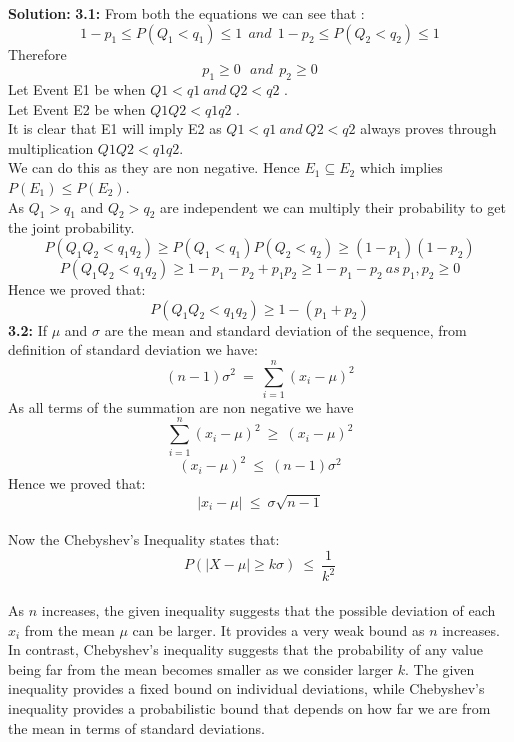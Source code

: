 \documentclass[12pt]{article}
\begin{document}
\textbf{Solution: } 
\newline
\textbf{3.1: } 
From both the equations we can see that :
\begin{equation*}
    1-p_1 \leq P(Q_1<q_1) \leq 1\ \ and\ \    
    1-p_2 \leq P(Q_2<q_2) \leq 1  
\end{equation*}
Therefore
\begin{equation}
    p_1\geq0\ \ \ and\ \  p_2\geq0
\end{equation}
Let Event E1 be when $Q1<q1\ and\ Q2<q2$ . \\
Let Event E2 be when $Q1Q2<q1q2$ . \\
\newline
It is clear that E1 will imply E2 as $Q1<q1\ and\ Q2<q2$ always proves through multiplication $Q1Q2<q1q2$. \\
We can do this as they are non negative.
Hence $E_1 \subseteq E_2$ which implies $P(E_1) \leq P(E_2)$.\\
As $Q_1>q_1$ and $Q_2>q_2$ are independent we can multiply their probability to get the joint probability.
\begin{equation*}
    P(Q_1Q_2<q_1q_2) \geq P(Q_1<q_1)P(Q_2<q_2) \geq (1-p_1)(1-p_2) 
\end{equation*}
\begin{equation*} 
    P(Q_1Q_2<q_1q_2) \geq 1-p_1-p_2+p_1p_2 \geq 1-p_1-p_2\ as\ p_1,p_2 \geq 0
\end{equation*}
Hence we proved that:
\begin{equation*}
    P(Q_1Q_2<q_1q_2) \geq 1-(p_1+p_2)
\end{equation*}
\textbf{3.2: } If $\mu$ and $\sigma$ are the mean and standard deviation of the sequence, from definition of standard deviation we have:
\begin{equation}
    (n-1){\sigma}^2\ =\ \sum_{i=1}^{n}(x_i-\mu)^2   
\end{equation} 
As all terms of the summation are non negative we have
\begin{equation}
    \sum_{i=1}^{n}(x_i-\mu)^2\ \geq \ (x_i-\mu)^2 
\end{equation}
\begin{equation*}
    (x_i-\mu)^2\ \leq\ (n-1){\sigma}^2
\end{equation*}
Hence we proved that:
\begin{equation}
    |x_i-\mu|\ \leq \ \sigma\sqrt{n-1}
\end{equation}
\\
Now the Chebyshev's Inequality states that:
\begin{equation*}
    P(|X-\mu| \geq k\sigma)\ \leq \ \frac{1}{k^2}
\end{equation*}
\\
As $n$ increases, the given inequality suggests that the possible deviation of each $x_i$ from the mean $\mu$ can be larger. It provides a very weak bound as $n$ increases.
 In contrast, Chebyshev’s inequality suggests that the probability of any value being far from the mean becomes smaller as we consider larger 
$k$. The given inequality provides a fixed bound on individual deviations, while Chebyshev’s inequality provides a probabilistic bound that depends on how far we are from the mean in terms of standard deviations.
\end{document}
